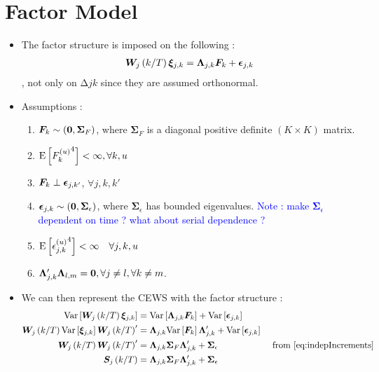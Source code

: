 \documentclass[main_document.tex]{subfiles}
\begin{document}
\section{Factor Model}
	\begin{itemize}
		\item The factor structure is imposed on the following : 
			\begin{align} \label{eq:factorStructure}
				\bm{W}_{j}\left(k/T\right) \bm{\xi}_{j,k} = \bm{\Lambda}_{j,k} \bm{F}_{k} + \bm{\epsilon}_{j,k}
			\end{align}
			, not only on $\increment{j}{k}$ since they are assumed orthonormal.
		\item Assumptions : 	
			\begin{enumerate}
				\item $\bm{F}_{k} \sim (\bm{0}, \bm{\Sigma}_F)$, where $\bm{\Sigma}_F$ is a diagonal positive definite $(K \times K)$ matrix. 
				\item $\mathrm{E}\left[{F_{k}^{(u)}}^4\right] < \infty, \forall k,u$
				\item $\bm{F}_{k} \perp \bm{\epsilon}_{j,k'}$, $\forall j,k,k'$
				\item $\bm{\epsilon}_{j,k} \sim (\bm{0}, \bm{\Sigma}_{\epsilon})$, where $\bm{\Sigma}_{\epsilon}$ has bounded eigenvalues. \textcolor{blue}{Note : make $\bm{\Sigma}_{\epsilon}$ dependent on time ? what about serial dependence ?}
				\item $\mathrm{E}\left[{\epsilon_{j,k}^{(u)}}^{4}\right] < \infty \quad \forall j,k,u$
				\item  $\bm{\Lambda}_{j,k}'\bm{\Lambda}_{l,m} = \bm{0}, \forall j \neq l, \forall k \neq m$. 
			\end{enumerate}
		\item We can then represent the CEWS with the factor structure : 
		\begin{align*}
			\mathrm{Var}\left[\bm{W}_{j}\left(k/T\right)\bm{\xi}_{j,k}\right]        	    &= \mathrm{Var}\left[\bm{\Lambda}_{j,k}\bm{F}_{k}\right] + \mathrm{Var}\left[\bm{\epsilon}_{j,k}\right] \\
			\bm{W}_{j}\left(k/T\right) \mathrm{Var}\left[\bm{\xi}_{j,k}\right] \bm{W}_{j}\left(k/T\right)' &= \bm{\Lambda}_{j,k}\mathrm{Var}\left[\bm{F}_{k}\right]\bm{\Lambda}_{j,k}' +  \mathrm{Var}\left[\bm{\epsilon}_{j,k}\right]\\
			\bm{W}_{j}\left(k/T\right)\bm{W}_{j}\left(k/T\right)' &=  \bm{\Lambda}_{j,k}\bm{\Sigma}_{F}\bm{\Lambda}_{j,k}' +  \bm{\Sigma}_{\epsilon} &\text{ from } \eqref{eq:indepIncrements}\\
			\bm{S}_{j}\left(k/T\right) &= \bm{\Lambda}_{j,k}\bm{\Sigma}_{F}\bm{\Lambda}_{j,k}' +  \bm{\Sigma}_{\epsilon}
		\end{align*}
	\end{itemize}
\end{document}
